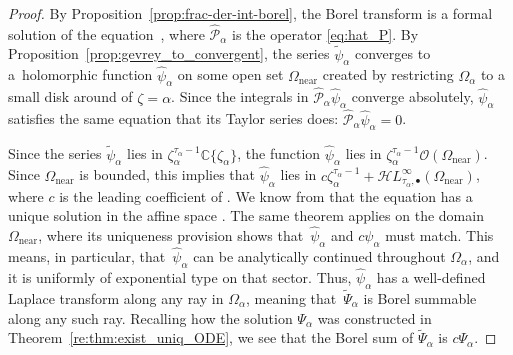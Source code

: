\documentclass[10pt,a4paper]{amsart}
\newcommand{\singexp}[2]{\mathcal{H}L^\infty_{#1, #2}}
\newcommand{\singexpalg}[1]{\singexp{#1}{\bullet}}
\newcommand{\C}{\mathbb{C}}
\newcommand{\series}[1]{\tilde{#1}}
\newcommand{\borel}{\mathcal{B}}
\numberwithin{equation}{section}
\begin{document}
\begin{proof}
By Proposition~\ref{prop:frac-der-int-borel}, the Borel transform \smash{$\series{\psi}_\alpha = \borel_\zeta \series{\Psi}_\alpha$} is a formal solution of the equation~\smash{$\hat{\mathcal{P}}_\alpha \series{\psi}_\alpha = 0$}, where $\hat{\mathcal{P}}_\alpha$ is the operator \eqref{eq:hat_P}. By Proposition~\ref{prop:gevrey_to_convergent}, the series $\series{\psi}_\alpha$ converges to a~holomorphic function $\hat{\psi}_\alpha$ on some open set $\Omega_\text{near}$ created by restricting $\Omega_\alpha$ to a small disk around of $\zeta = \alpha$. Since the integrals in $\hat{\mathcal{P}}_\alpha \hat{\psi}_\alpha$ converge absolutely, $\hat{\psi}_\alpha$ satisfies the same equation that its Taylor series does: $\hat{\mathcal{P}}_\alpha \hat{\psi}_\alpha = 0$.

Since the series $\series{\psi}_\alpha$ lies in $\zeta_\alpha^{\tau_\alpha-1} \C\{\zeta_\alpha\}$, the function $\hat{\psi}_\alpha$ lies in $\zeta_\alpha^{\tau_\alpha-1} \mathcal{O}(\Omega_\text{near})$. Since $\Omega_\text{near}$ is bounded, this implies that $\hat{\psi}_\alpha$ lies in $c \zeta_\alpha^{\tau_\alpha-1} + \singexpalg{\tau_\alpha}(\Omega_\text{near})$, where $c$ is the leading coefficient of \smash{$\series{\psi}_\alpha$}. We know from \cite[Theorem~4.6]{reg-sing-volterra} that the equation  has a unique solution in the affine space \smash{$\zeta_\alpha^{\tau_\alpha-1} + \singexpalg{\tau_\alpha}(\Omega_\alpha)$}. The same theorem applies on the domain $\Omega_\text{near}$, where its uniqueness provision shows that~$\hat{\psi}_\alpha$ and $c\psi_\alpha$ must match. This means, in particular, that~$\hat{\psi}_\alpha$ can be analytically continued throughout $\Omega_\alpha$, and it is uniformly of exponential type on that sector. Thus, $\hat{\psi}_\alpha$ has a well-defined Laplace transform along any ray  in $\Omega_\alpha$, meaning that~$\series{\Psi}_\alpha$ is Borel summable along any such ray. Recalling how the solution $\Psi_\alpha$ was constructed in Theorem~\ref{re:thm:exist_uniq_ODE}, we see that the Borel sum of $\series{\Psi}_\alpha$ is $c\Psi_\alpha$.
\end{proof}
\end{document}
